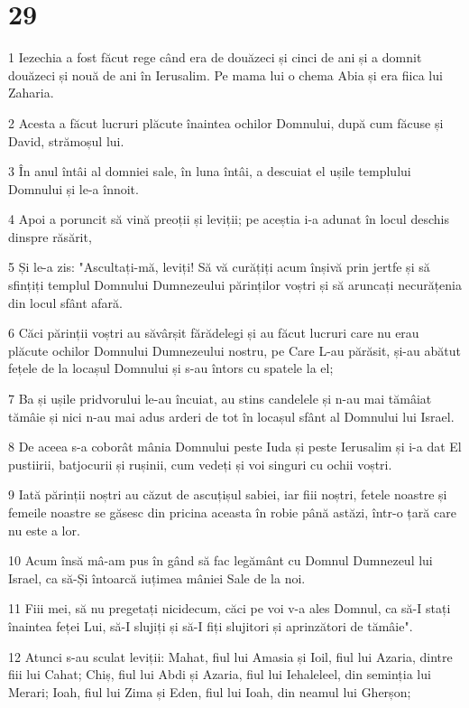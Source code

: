 \chapter{29}

\par 1 Iezechia a fost făcut rege când era de douăzeci și cinci de ani și a domnit douăzeci și nouă de ani în Ierusalim. Pe mama lui o chema Abia și era fiica lui Zaharia.
\par 2 Acesta a făcut lucruri plăcute înaintea ochilor Domnului, după cum făcuse și David, strămoșul lui.
\par 3 În anul întâi al domniei sale, în luna întâi, a descuiat el ușile templului Domnului și le-a înnoit.
\par 4 Apoi a poruncit să vină preoții și leviții; pe aceștia i-a adunat în locul deschis dinspre răsărit,
\par 5 Și le-a zis: "Ascultați-mă, leviți! Să vă curățiți acum înșivă prin jertfe și să sfințiți templul Domnului Dumnezeului părinților voștri și să aruncați necurățenia din locul sfânt afară.
\par 6 Căci părinții voștri au săvârșit fărădelegi și au făcut lucruri care nu erau plăcute ochilor Domnului Dumnezeului nostru, pe Care L-au părăsit, și-au abătut fețele de la locașul Domnului și s-au întors cu spatele la el;
\par 7 Ba și ușile pridvorului le-au încuiat, au stins candelele și n-au mai tămâiat tămâie și nici n-au mai adus arderi de tot în locașul sfânt al Domnului lui Israel.
\par 8 De aceea s-a coborât mânia Domnului peste Iuda și peste Ierusalim și i-a dat El pustiirii, batjocurii și rușinii, cum vedeți și voi singuri cu ochii voștri.
\par 9 Iată părinții noștri au căzut de ascuțișul sabiei, iar fiii noștri, fetele noastre și femeile noastre se găsesc din pricina aceasta în robie până astăzi, într-o țară care nu este a lor.
\par 10 Acum însă mâ-am pus în gând să fac legământ cu Domnul Dumnezeul lui Israel, ca să-Și întoarcă iuțimea mâniei Sale de la noi.
\par 11 Fiii mei, să nu pregetați nicidecum, căci pe voi v-a ales Domnul, ca să-I stați înaintea feței Lui, să-I slujiți și să-I fiți slujitori și aprinzători de tămâie".
\par 12 Atunci s-au sculat leviții: Mahat, fiul lui Amasia și Ioil, fiul lui Azaria, dintre fiii lui Cahat; Chiș, fiul lui Abdi și Azaria, fiul lui Iehaleleel, din seminția lui Merari; Ioah, fiul lui Zima și Eden, fiul lui Ioah, din neamul lui Gherșon;
